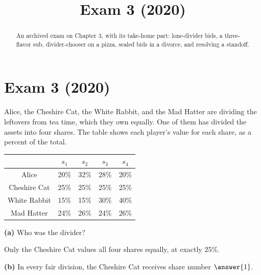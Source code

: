 \documentclass[12pt]{ximera}
\title{Exam 3 (2020)}
\begin{document}
\begin{abstract}
An archived exam on Chapter 3, with its take-home part: lone-divider bids, a three-flavor sub, divider-chooser on a pizza, sealed bids in a divorce, and resolving a standoff.
\end{abstract}
\maketitle

\section*{Exam 3 (2020)}

\begin{problem}
Alice, the Cheshire Cat, the White Rabbit, and the Mad Hatter are dividing the leftovers
from tea time, which they own equally. One of them has divided the assets into four shares.
The table shows each player's value for each share, as a percent of the total.
\begin{center}
\begin{tabular}{|c|c|c|c|c|}\hline
 & $s_1$ & $s_2$ & $s_3$ & $s_4$\\\hline
Alice & 20\% & 32\% & 28\% & 20\%\\\hline
Cheshire Cat & 25\% & 25\% & 25\% & 25\%\\\hline
White Rabbit & 15\% & 15\% & 30\% & 40\%\\\hline
Mad Hatter & 24\% & 26\% & 24\% & 26\%\\\hline
\end{tabular}
\end{center}

\begin{prompt}
\textbf{(a)} Who was the divider?
\begin{multipleChoice}
\end{multipleChoice}
\begin{feedback}
Only the Cheshire Cat values all four shares equally, at exactly $25\%$.
\end{feedback}
\end{prompt}

\begin{prompt}
\textbf{(b)} In every fair division, the Cheshire Cat receives share number
$\answer{1}$.


\end{prompt}
\end{problem}
\end{document}
